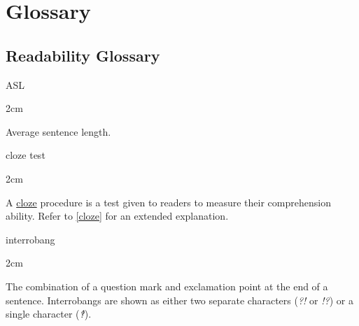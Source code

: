 \documentclass[
]{book}
\newenvironment{glsentry}
  {
  \begin{minipage}{\textwidth}
  }
  {
  \end{minipage}
  }
\newenvironment{glsterm}
  {
  \bfseries
  }
  {
  }
\newenvironment{glsdef}
  {
  \noindent
  \flushleft
  \begin{adjustwidth}{2cm}{}
  }
  {
  \end{adjustwidth}
  }
\theoremstyle{definition}
\theoremstyle{definition}
\theoremstyle{definition}
\theoremstyle{definition}
\theoremstyle{remark}
\begin{document}
\hypertarget{glossary}{%
\chapter{Glossary}\label{glossary}}

\hypertarget{readability-glossary}{%
\section{Readability Glossary}\label{readability-glossary}}

\begin{glsentry}

\begin{glsterm}
ASL

\end{glsterm}

\begin{glsdef}
Average sentence length.

\end{glsdef}

\end{glsentry}

\begin{glsentry}

\begin{glsterm}
cloze test

\end{glsterm}

\begin{glsdef}
A \protect\hyperlink{cloze}{cloze} procedure is a test given to readers to measure their comprehension ability. Refer to \ref{cloze} for an extended explanation.

\end{glsdef}

\end{glsentry}

\begin{glsentry}

\begin{glsterm}
interrobang

\end{glsterm}

\begin{glsdef}
The combination of a question mark and exclamation point at the end of a sentence. Interrobangs are shown as either two separate characters (\emph{?!} or \emph{!?}) or a single character (\emph{‽}).

\end{glsdef}

\end{glsentry}
\end{document}

